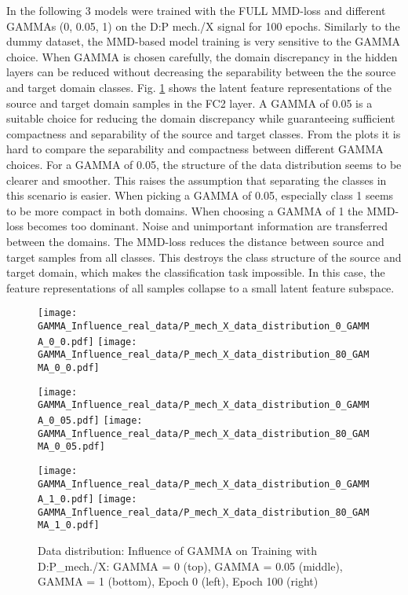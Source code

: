 In the following 3 models were trained with the FULL MMD-loss and different GAMMAs (0, 0.05, 1) on the  D:P mech./X signal for 100 epochs. Similarly to the dummy dataset, the MMD-based model training is very sensitive to the GAMMA choice. When GAMMA is chosen carefully, the domain discrepancy in the hidden layers can be reduced without decreasing the separability between the the source and target domain classes. Fig. \ref{fig:distribution_GAMMA_influence_real_data} shows the latent feature representations of the source and target domain samples in the FC2 layer. A GAMMA of 0.05 is a suitable choice for reducing the domain discrepancy while guaranteeing sufficient compactness and separability of the source and target classes. From the plots it is hard to compare the separability and compactness between different GAMMA choices. For a GAMMA of 0.05, the structure of the data distribution seems to be clearer and smoother. This raises the assumption that separating the classes in this scenario is easier. When picking a GAMMA of 0.05, especially class 1 seems to be more compact in both domains. When choosing a GAMMA of 1 the MMD-loss becomes too dominant. Noise and unimportant information are transferred between the domains. The MMD-loss reduces the distance between source and target samples from all classes. This destroys the class structure of the source and target domain, which makes the classification task impossible. In this case, the feature representations of all samples collapse to a small latent feature subspace.

\begin{figure}[H]
  \centering
  \texttt{[image: GAMMA\_Influence\_real\_data/P\_mech\_X\_data\_distribution\_0\_GAMMA\_0\_0.pdf]}
  \hspace{.4cm}
  \texttt{[image: GAMMA\_Influence\_real\_data/P\_mech\_X\_data\_distribution\_80\_GAMMA\_0\_0.pdf]}

  \vspace{.1cm}

  \texttt{[image: GAMMA\_Influence\_real\_data/P\_mech\_X\_data\_distribution\_0\_GAMMA\_0\_05.pdf]}
  \hspace{.4cm}
  \texttt{[image: GAMMA\_Influence\_real\_data/P\_mech\_X\_data\_distribution\_80\_GAMMA\_0\_05.pdf]}

  \vspace{.1cm}

  \texttt{[image: GAMMA\_Influence\_real\_data/P\_mech\_X\_data\_distribution\_0\_GAMMA\_1\_0.pdf]}
  \hspace{.4cm}
  \texttt{[image: GAMMA\_Influence\_real\_data/P\_mech\_X\_data\_distribution\_80\_GAMMA\_1\_0.pdf]}

  \vspace{.1cm}

  \caption{Data  distribution:  Influence  of  GAMMA  on  Training with D:P\_mech./X:  GAMMA  =  0  (top), GAMMA = 0.05 (middle), GAMMA = 1 (bottom), Epoch 0 (left), Epoch 100 (right)}
  \label{fig:distribution_GAMMA_influence_real_data}
\end{figure}


